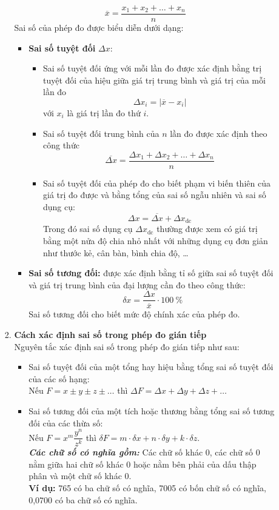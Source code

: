 \begin{enumerate}[label=\bfseries\Roman*.]
\begin{enumerate}[label=\bfseries\arabic*.]
\begin{enumerate}[label=\bfseries\arabic*.]
$$\overline{x}=\dfrac{x_1+x_2+\dots+x_n}{n}$$
Sai số của phép đo được biểu diễn dưới dạng:
\begin{itemize}
	\item \textbf{Sai số tuyệt đối} $\Delta x$:
	\begin{itemize}
		\item Sai số tuyệt đối ứng với mỗi lần đo được xác định bằng trị tuyệt đối của hiệu giữa giá trị trung bình và giá trị của mỗi lần đo
		$$\Delta x_i=\left|\overline{x}-x_i\right|$$
		với $x_i$ là giá trị lần đo thứ $i$.
		\item Sai số tuyệt đối trung bình của $n$ lần đo được xác định theo công thức
		$$\overline{\Delta x}=\dfrac{\Delta x_1+\Delta x_2+\dots+\Delta x_n}{n}$$
		\item Sai số tuyệt đối của phép đo cho biết phạm vi biến thiên của giá trị đo được và bằng tổng của sai số ngẫu nhiên và sai số dụng cụ:
		$$\Delta x=\overline{\Delta x}+\Delta x_{\text{dc}}$$
		Trong đó sai số dụng cụ $\Delta x_{\text{dc}}$ thường được xem có giá trị bằng một nửa độ chia nhỏ nhất với những dụng cụ đơn giản như thước kẻ, cân bàn, bình chia độ, \dots
	\end{itemize}
\item \textbf{Sai số tương đối:} được xác định bằng tỉ số giữa sai số tuyệt đối và giá trị trung bình của đại lượng cần đo theo công thức:
$$\delta x=\dfrac{\Delta x}{\overline{x}}\cdot\SI{100}{\percent}$$
Sai số tương đối cho biết mức độ chính xác của phép đo.
\end{itemize}
\item \textbf{Cách xác định sai số trong phép đo gián tiếp}\\
Nguyên tắc xác định sai số trong phép đo gián tiếp như sau:
\begin{itemize}
	\item Sai số tuyệt đối của một tổng hay hiệu bằng tổng sai số tuyệt đối của các số hạng:\\
	Nếu $F=x\pm y\pm z\pm\dots$ thì $\Delta F=\Delta x+\Delta y+\Delta z+\dots$
	\item Sai số tương đối của một tích hoặc thương bằng tổng sai số tương đối của các thừa số:\\
	Nếu $F=x^m\dfrac{y^n}{z^k}$ thì $\delta F=m\cdot\delta x+n\cdot\delta y+k\cdot\delta z$.\\
	\textbf{\textit{Các chữ số có nghĩa gồm:}} Các chữ số khác 0, các chữ số 0 nằm giữa hai chữ số khác 0 hoặc nằm bên phải của dấu thập phân và một chữ số khác 0.\\
	\textbf{Ví dụ:} 765 có ba chữ số có nghĩa, 7005 có bốn chữ số có nghĩa, 0,0700 có ba chữ số có nghĩa.
\end{itemize}
\end{enumerate}

	\end{enumerate}
\end{enumerate}

